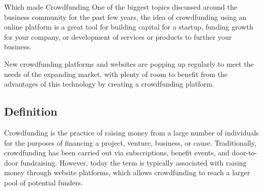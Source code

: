 Which made Crowdfunding One of the biggest topics discussed around the business community for the past few years, the idea of crowdfunding using an online platform is a great tool for building capital for a startup, funding growth for your company, or development of services or products to further your business.

New crowdfunding platforms and websites are popping up regularly to meet the needs of the expanding market, with plenty of room to benefit from the advantages of this technology by creating a crowdfunding platform.


\subsection*{Definition}
Crowdfunding is the practice of raising money from a large number of individuals for the purposes of financing a project, venture, business, or cause. Traditionally, crowdfunding has been carried out via subscriptions, benefit events, and door-to-door fundraising. However, today the term is typically associated with raising money through website platforms, which allows crowdfunding to reach a larger pool of potential funders.







